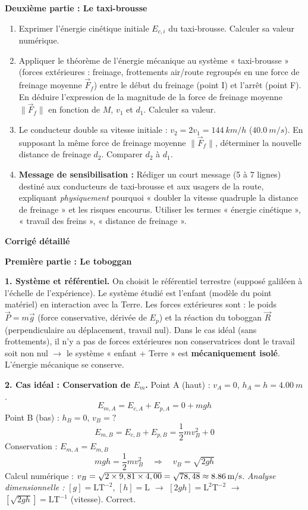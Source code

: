 \documentclass[11pt]{article}
\begin{document}
\begin{exoresolu}
\noindent \textbf{Deuxième partie : Le taxi-brousse}
\begin{enumerate}
    \item[5.] Exprimer l'énergie cinétique initiale $E_{c,i}$ du taxi-brousse. Calculer sa valeur numérique.
    \item[6.] Appliquer le théorème de l'énergie mécanique au système « taxi-brousse » (forces extérieures : freinage, frottements air/route regroupés en une force de freinage moyenne $\vec{F}_f$) entre le début du freinage (point I) et l'arrêt (point F). En déduire l'expression de la magnitude de la force de freinage moyenne $\|\vec{F}_f\|$ en fonction de $M$, $v_1$ et $d_1$. Calculer sa valeur.
    \item[7.] Le conducteur double sa vitesse initiale : $v_2 = 2v_1 = \SI{144}{km/h}$ ($\SI{40,0}{m/s}$). En supposant la même force de freinage moyenne $\|\vec{F}_f\|$, déterminer la nouvelle distance de freinage $d_2$. Comparer $d_2$ à $d_1$.
    \item[8.] \textbf{Message de sensibilisation :} Rédiger un court message (5 à 7 lignes) destiné aux conducteurs de taxi-brousse et aux usagers de la route, expliquant \emph{physiquement} pourquoi « doubler la vitesse quadruple la distance de freinage » et les risques encourus. Utiliser les termes « énergie cinétique », « travail des freins », « distance de freinage ».
\end{enumerate}

\tcblower

\textbf{Corrigé détaillé}

\noindent \textbf{Première partie : Le toboggan}

\noindent \textbf{1. Système et référentiel.}
On choisit le référentiel terrestre (supposé galiléen à l'échelle de l'expérience). Le système étudié est l'enfant (modèle du point matériel) en interaction avec la Terre. Les forces extérieures sont : le poids $\vec{P} = m\vec{g}$ (force conservative, dérivée de $E_p$) et la réaction du toboggan $\vec{R}$ (perpendiculaire au déplacement, travail nul). Dans le cas idéal (sans frottements), il n'y a pas de forces extérieures non conservatrices dont le travail soit non nul $\rightarrow$ le système « enfant + Terre » est \textbf{mécaniquement isolé}. L'énergie mécanique se conserve.

\noindent \textbf{2. Cas idéal : Conservation de $E_m$.}
Point A (haut) : $v_A = 0$, $h_A = h = \SI{4,00}{m}$.
\[ E_{m,A} = E_{c,A} + E_{p,A} = 0 + m g h \]
Point B (bas) : $h_B = 0$, $v_B = ?$
\[ E_{m,B} = E_{c,B} + E_{p,B} = \frac{1}{2} m v_B^2 + 0 \]
Conservation : $E_{m,A} = E_{m,B}$
\[ m g h = \frac{1}{2} m v_B^2 \quad \Rightarrow \quad v_B = \sqrt{2 g h} \]
Calcul numérique : $v_B = \sqrt{2 \times 9,81 \times 4,00} = \sqrt{78,48} \approx \textbf{\SI{8,86}{m/s}}$.
\emph{Analyse dimensionnelle :} $[g] = \text{L}\text{T}^{-2}$, $[h] = \text{L}$ $\rightarrow$ $[2gh] = \text{L}^2\text{T}^{-2}$ $\rightarrow$ $[\sqrt{2gh}] = \text{L}\text{T}^{-1}$ (vitesse). Correct.


\end{exoresolu}
\end{document}
